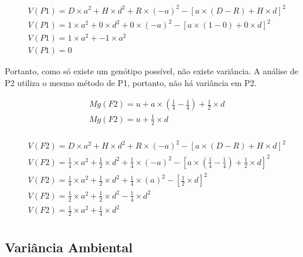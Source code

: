 \begin{definition}[Variância de P1]

\begin{align}
&  V(P1) = D\times a^2 + H \times d^2 + R \times (-a)^2 - [ a \times (D-R) + H \times d ]^2 \\
&  V(P1) = 1\times a^2 + 0 \times d^2 + 0 \times (-a)^2 - [ a \times (1-0) + 0 \times d ]^2 \\
&  V(P1) = 1\times a^2 + -  1\times a^2 \\
&  V(P1) = 0
\end{align}

Portanto, como só existe um genótipo possível, não existe variância. A análise de P2 utiliza o mesmo método de P1, portanto, não há variância em P2.
\end{definition}


\begin{definition}[Análise de F2]

\begin{align}
&  Mg(F2) = u + a \times (\frac{1}{4}- \frac{1}{4}) + \frac{1}{2} \times d\\
&  Mg(F2) = u + \frac{1}{2} \times d\\
\end{align}
\end{definition}


\begin{definition}[Variância de F2]

\begin{align}
&  V(F2) = D\times a^2 + H \times d^2 + R \times (-a)^2 - [ a \times (D-R) + H \times d ]^2 \\
&  V(F2) = \frac{1}{4}\times a^2 + \frac{1}{2}\times d^2 + \frac{1}{4} \times (-a)^2 - [ a \times (\frac{1}{4}- \frac{1}{4}) + \frac{1}{2} \times d ]^2 \\
&  V(F2) = \frac{1}{4}\times a^2 + \frac{1}{2}\times d^2 + \frac{1}{4} \times (a)^2 - [ \frac{1}{2} \times d ]^2 \\
&  V(F2) = \frac{1}{2}\times a^2 + \frac{1}{2}\times d^2 - \frac{1}{4} \times d^2 \\
&  V(F2) = \frac{1}{2}\times a^2 + \frac{1}{4} \times d^2 \\
\end{align}
\end{definition}


\subsection{Variância Ambiental}


